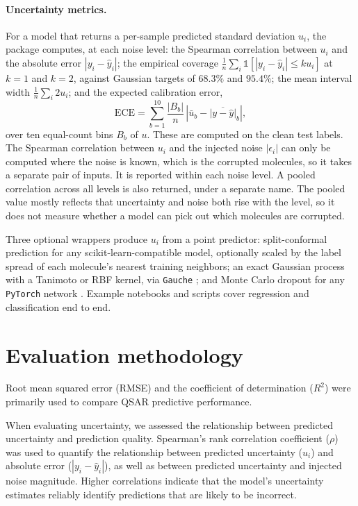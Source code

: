 \paragraph{Uncertainty metrics.} For a model that returns a per-sample predicted standard deviation
$u_i$, the package computes, at each noise level: the Spearman correlation between $u_i$ and the
absolute error $|y_i - \hat{y}_i|$; the empirical coverage $\frac{1}{n}\sum_i \mathbb{1}\left[|y_i -
\hat{y}_i| \le k u_i\right]$ at $k = 1$ and $k = 2$, against Gaussian targets of $68.3\%$ and
$95.4\%$; the mean interval width $\frac{1}{n}\sum_i 2u_i$; and the expected calibration error,
\begin{equation}
\mathrm{ECE} = \sum_{b=1}^{10} \frac{|B_b|}{n}\,\left|\bar{u}_b - \overline{|y - \hat{y}|}_b\right|,
\label{eq:ece}
\end{equation}
over ten equal-count bins $B_b$ of $u$. These are computed on the clean test labels. The Spearman
correlation between $u_i$ and the injected noise $|\epsilon_i|$ can only be computed where the noise
is known, which is the corrupted molecules, so it takes a separate pair of inputs. It is reported
within each noise level. A pooled correlation across all levels is also returned, under a separate
name. The pooled value mostly reflects that uncertainty and noise both rise with the level, so it
does not measure whether a model can pick out which molecules are corrupted.

Three optional wrappers produce $u_i$ from a point predictor: split-conformal prediction for any
scikit-learn-compatible model, optionally scaled by the label spread of each molecule's nearest
training neighbors; an exact Gaussian process with a Tanimoto or RBF kernel, via \texttt{Gauche}
\citep{gauche}; and Monte Carlo dropout for any \texttt{PyTorch} network \citep{gal2016}. Example
notebooks and scripts cover regression and classification end to end.


\section{Evaluation methodology}


Root mean squared error (RMSE) and the coefficient of determination ($R^2$) were primarily used to compare QSAR predictive performance.


When evaluating uncertainty, we assessed the relationship between predicted uncertainty and prediction quality. Spearman's rank correlation coefficient ($\rho$) was used to quantify the relationship between predicted uncertainty ($u_i$) and absolute error ($|y_i - \hat{y}_i|$), as well as between predicted uncertainty and injected noise magnitude. Higher correlations indicate that the model's uncertainty estimates reliably identify predictions that are likely to be incorrect.

